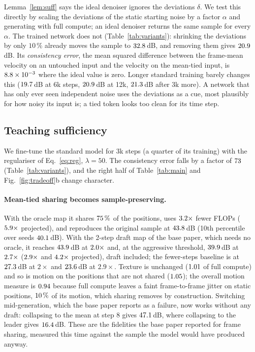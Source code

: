 Lemma~\ref{lem:suff} says the ideal denoiser ignores the deviations $\delta$.
We test this directly by scaling the deviations of the static starting noise by a factor $\alpha$ and generating with full compute; an ideal denoiser returns the same sample for every $\alpha$.
The trained network does not (Table~\ref{tab:variants}): shrinking the deviations by only $10\,\%$ already moves the sample to $32.8$\,dB, and removing them gives $20.9$\,dB.
Its \emph{consistency error}, the mean squared difference between the frame-mean velocity on an untouched input and the velocity on the mean-tied input, is $8.8\times10^{-3}$ where the ideal value is zero.
Longer standard training barely changes this ($19.7$\,dB at 6k steps, $20.9$\,dB at 12k, $21.3$\,dB after 3k more).
A network that has only ever seen independent noise uses the deviations as a cue, most plausibly for how noisy its input is; a tied token looks too clean for its time step.

\subsection{Teaching sufficiency}

We fine-tune the standard model for 3k steps (a quarter of its training) with the regulariser of Eq.~\ref{eq:reg}, $\lambda=50$.
The consistency error falls by a factor of $73$ (Table~\ref{tab:variants}), and the right half of Table~\ref{tab:main} and Fig.~\ref{fig:tradeoff}b change character.

\paragraph{Mean-tied sharing becomes sample-preserving.}
With the oracle map it shares $75\,\%$ of the positions, uses $3.2\times$ fewer FLOPs ($5.9\times$ projected), and reproduces the original sample at $43.8$\,dB (10th percentile over seeds $40.1$\,dB).
With the 2-step draft map of the base paper, which needs no oracle, it reaches $43.9$\,dB at $2.0\times$ and, at the aggressive threshold, $39.9$\,dB at $2.7\times$ ($2.9\times$ and $4.2\times$ projected), draft included; the fewer-steps baseline is at $27.3$\,dB at $2\times$ and $23.6$\,dB at $2.9\times$.
Texture is unchanged ($1.01$ of full compute) and so is motion on the positions that are not shared ($1.05$); the overall motion measure is $0.94$ because full compute leaves a faint frame-to-frame jitter on static positions, $10\,\%$ of its motion, which sharing removes by construction.
Switching mid-generation, which the base paper reports as a failure, now works without any draft: collapsing to the mean at step 8 gives $47.1$\,dB, where collapsing to the leader gives $16.4$\,dB.
These are the fidelities the base paper reported for frame sharing, measured this time against the sample the model would have produced anyway.

